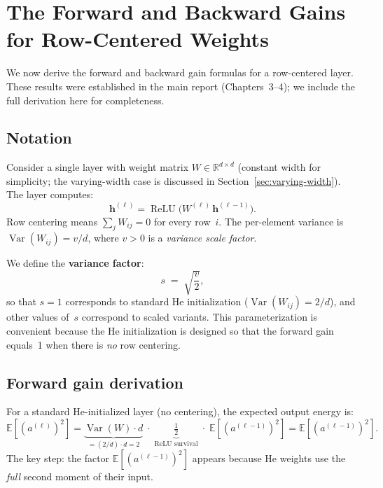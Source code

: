 \documentclass[11pt,a4paper]{article}
\theoremstyle{definition}
\newcommand{\R}{\mathbb{R}}
\newcommand{\E}{\mathbb{E}}
\newcommand{\Var}{\operatorname{Var}}
\newcommand{\relu}{\operatorname{ReLU}}
\begin{document}
\section{The Forward and Backward Gains for Row-Centered Weights}
\label{sec:gains}

We now derive the forward and backward gain formulas for a
row-centered layer.  These results were established in the
main report (Chapters~3--4); we include the full derivation
here for completeness.

\subsection{Notation}

Consider a single layer with weight matrix $W \in \R^{d \times d}$
(constant width for simplicity; the varying-width case is discussed
in Section~\ref{sec:varying-width}).  The layer computes:
\[
  \bm{h}^{(\ell)} = \relu\!\bigl(W^{(\ell)}\,\bm{h}^{(\ell-1)}\bigr).
\]
Row centering means $\sum_j W_{ij} = 0$ for every row~$i$.
The per-element variance is $\Var(W_{ij}) = v/d$, where $v > 0$
is a \emph{variance scale factor}.

We define the \textbf{variance factor}:
\begin{equation}\label{eq:s-def}
  s \;=\; \sqrt{\frac{v}{2}},
\end{equation}
so that $s = 1$ corresponds to standard He initialization
($\Var(W_{ij}) = 2/d$), and other values of~$s$ correspond
to scaled variants.  This parameterization is convenient because
the He initialization is designed so that the forward gain
equals~1 when there is \emph{no} row centering.

\subsection{Forward gain derivation}
\label{sec:fwd-derivation}

For a standard He-initialized layer (no centering), the expected
output energy is:
\begin{equation}\label{eq:he-energy}
  \E[(a^{(\ell)})^2]
  = \underbrace{\Var(W) \cdot d}_{= (2/d) \cdot d = 2}
    \;\cdot\; \underbrace{\tfrac{1}{2}}_{\text{ReLU survival}}
    \;\cdot\; \E[(a^{(\ell-1)})^2]
  = \E[(a^{(\ell-1)})^2].
\end{equation}
The key step: the factor $\E[(a^{(\ell-1)})^2]$ appears because
He weights use the \emph{full} second moment of their input.
\end{document}
